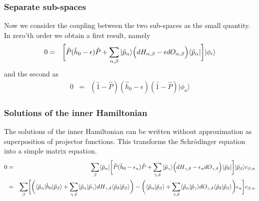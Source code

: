\documentclass[11pt,a4paper]{report}
\begin{document}
\subsubsection{Separate sub-spaces}
Now we consider the coupling between the two sub-spaces as the small
quantity. In zero'th order we obtain a first result, namely
\begin{eqnarray}
0&=&\biggl[
\hat{P}(\hat{h}_0-\epsilon)\hat{P}+\sum_{\alpha,\beta}|\tilde{p}_\alpha\rangle
\Bigl(dH_{\alpha,\beta}-\epsilon dO_{\alpha,\beta}\Bigr)
\langle\tilde{p}_\alpha|\biggr]|\phi_i\rangle
\end{eqnarray}
and the second as
\begin{eqnarray}
0&=&(\hat{1}-\hat{P})(\hat{h}_0-\epsilon)(\hat{1}-\hat{P})
|\phi_o\rangle
\end{eqnarray}

\subsubsection{Solutions of the inner Hamiltonian}
The solutions of the inner Hamiltonian can be written without
approximation as superposition of projector functions. This transforms
the Schr\"odinger equation into a simple matrix equation.
\begin{eqnarray}
0&=&\sum_\beta\langle\tilde{p}_\alpha|\biggl[
\hat{P}(\hat{h}_0-\epsilon_n)\hat{P}+\sum_{\gamma,\delta}|\tilde{p}_\gamma\rangle
\Bigl(dH_{\gamma,\delta}-\epsilon_n dO_{\gamma,\delta}\Bigr)
\langle\tilde{p}_\delta|\biggr]|\tilde{p}_\beta\rangle c_{\beta,n}
\nonumber\\
&=&\sum_\beta
\biggl[\biggl(\langle\tilde{p}_\alpha|\hat{h}_0|\tilde{p}_\beta\rangle
+\sum_{\gamma,\delta}
\langle\tilde{p}_\alpha|\tilde{p}_\gamma\rangle
dH_{\gamma,\delta}
\langle\tilde{p}_\delta|\tilde{p}_\beta\rangle\biggr)
-\biggl(\langle\tilde{p}_\alpha|\tilde{p}_\beta\rangle
+\sum_{\gamma,\delta}
\langle\tilde{p}_\alpha|\tilde{p}_\gamma\rangle
dO_{\gamma,\delta}
\langle\tilde{p}_\delta|\tilde{p}_\beta\rangle
\biggr)\epsilon_n
\biggr] c_{\beta,n}
\nonumber\\
\end{eqnarray}

\end{document}
